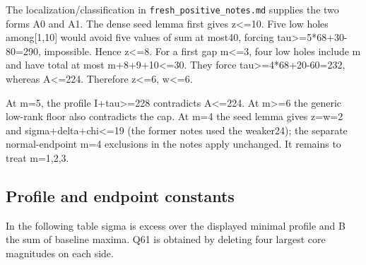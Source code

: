 \documentclass[10pt,a4paper]{article}
\theoremstyle{definition}
\begin{document}
The localization/classification in
\texttt{fresh\_\allowbreak{}\allowbreak{}positive\_\allowbreak{}\allowbreak{}notes.md} supplies the two
forms A0 and A1. The dense seed lemma first gives z\textless=\allowbreak{}10. Five
low holes among{[}1,\allowbreak{}10{]} would avoid five values of sum at most40,\allowbreak{}
forcing tau\textgreater=\allowbreak{}5*68+\allowbreak{}30-80=\allowbreak{}290,\allowbreak{} impossible. Hence z\textless=\allowbreak{}8.
For a first gap m\textless=\allowbreak{}3,\allowbreak{} four low holes include m and have total at
most m+\allowbreak{}8+\allowbreak{}9+\allowbreak{}10\textless=\allowbreak{}30. They force tau\textgreater=\allowbreak{}4*68+\allowbreak{}20-60=\allowbreak{}232,\allowbreak{}
whereas A\textless=\allowbreak{}224. Therefore z\textless=\allowbreak{}6,\allowbreak{} w\textless=\allowbreak{}6.

At m=\allowbreak{}5,\allowbreak{} the profile I+\allowbreak{}tau\textgreater=\allowbreak{}228 contradicts A\textless=\allowbreak{}224. At
m\textgreater=\allowbreak{}6 the generic low-rank floor also contradicts the cap. At
m=\allowbreak{}4 the seed lemma gives z=\allowbreak{}w=\allowbreak{}2 and sigma+\allowbreak{}delta+\allowbreak{}chi\textless=\allowbreak{}19 (the
former notes used the weaker24); the separate normal-endpoint m=\allowbreak{}4
exclusions in the notes apply unchanged. It remains to treat m=\allowbreak{}1,\allowbreak{}2,\allowbreak{}3.

\hypertarget{profile-and-endpoint-constants}{%
\subsection{Profile and endpoint
constants}\label{profile-and-endpoint-constants}}

In the following table sigma is excess over the displayed minimal
profile and B the sum of baseline maxima. Q61 is obtained by deleting
four largest core magnitudes on each side.
\end{document}
